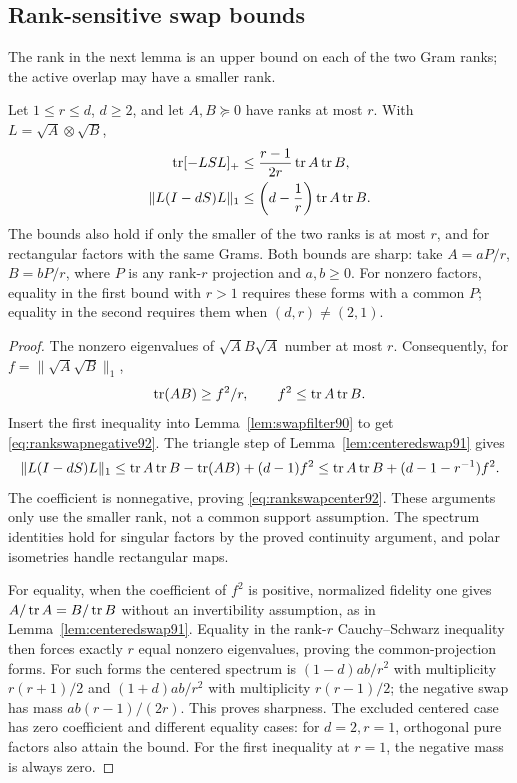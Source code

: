 \subsection{Rank-sensitive swap bounds}
The rank in the next lemma is an upper bound on each of the two Gram
ranks; the active overlap may have a smaller rank.
\begin{lemma}\label{lem:rankswap92}
Let $1\le r\le d$, $d\ge2$, and let $A,B\succeq0$ have ranks at most
$r$.  With $L=\sqrt A\otimes\sqrt B$,
\begin{align}
 \operatorname{tr}[-LSL]_+&\le\frac{r-1}{2r}\operatorname{tr} A\operatorname{tr} B,
 \label{eq:rankswapnegative92}\\
 \|L(I-dS)L\|_1&\le\left(d-\frac1r\right)\operatorname{tr} A\operatorname{tr} B.
 \label{eq:rankswapcenter92}
\end{align}
The bounds also hold if only the smaller of the two ranks is at most
$r$, and for rectangular factors with the same Grams.  Both bounds
are sharp: take $A=aP/r$, $B=bP/r$, where $P$ is any rank-$r$
projection and $a,b\ge0$.  For nonzero factors, equality in the first
bound with $r>1$ requires these forms with a common $P$; equality in
the second requires them when $(d,r)\ne(2,1)$.
\end{lemma}
\begin{proof}
The nonzero eigenvalues of $\sqrt A B\sqrt A$ number at most $r$.
Consequently, for $f=\|\sqrt A\sqrt B\|_1$,
\[
 \operatorname{tr}(AB)\ge f^2/r,\qquad f^2\le\operatorname{tr} A\operatorname{tr} B.
\]
Insert the first inequality into Lemma~\ref{lem:swapfilter90} to get
\eqref{eq:rankswapnegative92}.  The triangle step of
Lemma~\ref{lem:centeredswap91} gives
\[
 \|L(I-dS)L\|_1
 \le\operatorname{tr} A\operatorname{tr} B-\operatorname{tr}(AB)+(d-1)f^2
 \le\operatorname{tr} A\operatorname{tr} B+(d-1-r^{-1})f^2.
\]
The coefficient is nonnegative, proving \eqref{eq:rankswapcenter92}.
These arguments only use the smaller rank, not a common support
assumption.  The spectrum identities hold for singular factors by the
proved continuity argument, and polar isometries handle rectangular
maps.

For equality, when the coefficient of $f^2$ is positive, normalized
fidelity one gives $A/\operatorname{tr} A=B/\operatorname{tr} B$ without an invertibility
assumption, as in Lemma~\ref{lem:centeredswap91}.  Equality in the
rank-$r$ Cauchy--Schwarz inequality then forces exactly $r$ equal
nonzero eigenvalues, proving the common-projection forms.
For such forms the centered spectrum is $(1-d)ab/r^2$ with
multiplicity $r(r+1)/2$ and $(1+d)ab/r^2$ with multiplicity $r(r-1)/2$;
the negative swap has mass $ab(r-1)/(2r)$.  This proves sharpness.
The excluded centered case has zero coefficient and different equality
cases: for $d=2,r=1$, orthogonal pure factors also attain the bound.
For the first inequality at $r=1$, the negative mass is always zero.
\end{proof}

